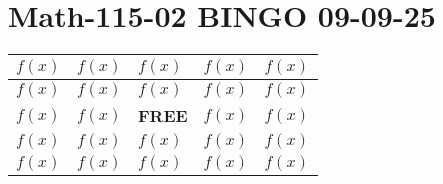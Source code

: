 \documentclass{article}
\begin{document}
\centering
\section*{Math-115-02 BINGO \hspace{9cm} 09-09-25}
\renewcommand{\arraystretch}{1.2}

\begin{tabular}{|>{\centering\arraybackslash}m{3cm}|>{\centering\arraybackslash}m{3cm}|>{\centering\arraybackslash}m{3cm}|>{\centering\arraybackslash}m{3cm}|>{\centering\arraybackslash}m{3cm}|}
\hline
\rule{0pt}{2cm}$f(x)$\vspace{1cm} & \rule{0pt}{2cm}$f(x)$ & \rule{0pt}{2cm}$f(x)$ & \rule{0pt}{2cm}$f(x)$ & \rule{0pt}{2cm}$f(x)$ \\
\hline
\rule{0pt}{2cm}$f(x)$ & \rule{0pt}{2cm}$f(x)$ & \rule{0pt}{2cm}$f(x)$ & \rule{0pt}{2cm}$f(x)$ & \rule{0pt}{2cm}$f(x)$ \\[2.5cm]
\hline
\rule{0pt}{2cm}$f(x)$ & \rule{0pt}{2cm}$f(x)$ & \rule{0pt}{2cm}\textbf{FREE} & \rule{0pt}{2cm}$f(x)$ & \rule{0pt}{2cm}$f(x)$ \\[2.5cm]
\hline
\rule{0pt}{2cm}$f(x)$ & \rule{0pt}{2cm}$f(x)$ & \rule{0pt}{2cm}$f(x)$ & \rule{0pt}{2cm}$f(x)$ & \rule{0pt}{2cm}$f(x)$ \\[2.5cm]
\hline
\rule{0pt}{2cm}$f(x)$ & \rule{0pt}{2cm}$f(x)$ & \rule{0pt}{2cm}$f(x)$ & \rule{0pt}{2cm}$f(x)$ & \rule{0pt}{2cm}$f(x)$ \\[2.5cm]
\hline
\end{tabular}

\vspace{4cm}
\end{document}
